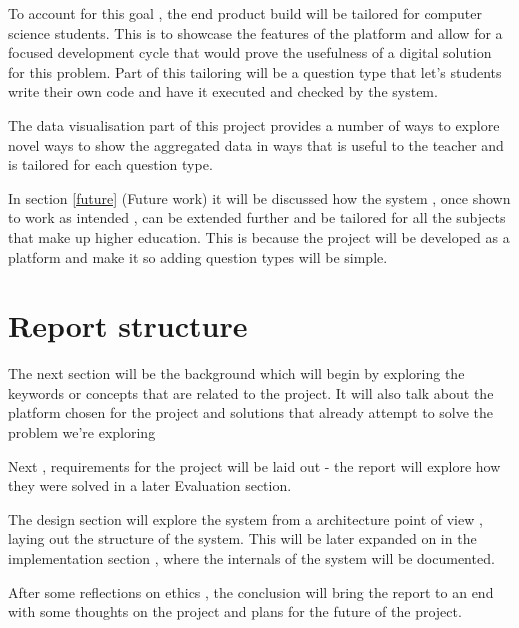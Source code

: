\documentclass[11pt]{informatics-report}
\begin{document}
To account for this goal , the end product build will be tailored for computer science students. This is to showcase the features of the platform and allow for a focused development cycle that would prove the usefulness of a digital solution for this problem. Part of this tailoring will be a question type that let's students write their own code and have it executed and checked by the system.

The data visualisation part of this project provides a number of ways to explore novel ways to show the aggregated data in ways that is useful to the teacher and is tailored for each question type.

In section \ref{future} (Future work) it will be discussed how the system , once shown to work as intended , can be extended further and be tailored for all the subjects that make up higher education. This is because the project will be developed as a platform and make it so adding question types will be simple.


\section{Report structure}
The next section will be the background which will begin by exploring the keywords or concepts that are related to the project. It will also talk about the platform chosen for the project and solutions that already attempt to solve the problem we're exploring

Next , requirements for the project will be laid out - the report will explore how they were solved in a later Evaluation section.

The design section will explore the system from a architecture point of view , laying out the structure of the system. This will be later expanded on in the implementation section , where the internals of the system will be documented.

After some reflections on ethics , the conclusion will bring the report to an end with some thoughts on the project and plans for the future of the project.












\appendix



\end{document}
